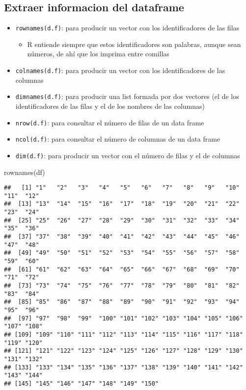 \documentclass[
]{article}
\newenvironment{Shaded}{\begin{snugshade}}{\end{snugshade}}
\newcommand{\FunctionTok}[1]{\textcolor[rgb]{0.00,0.00,0.00}{#1}}
\newcommand{\NormalTok}[1]{#1}
\providecommand{\tightlist}{%
  \setlength{\itemsep}{0pt}\setlength{\parskip}{0pt}}
\begin{document}
\hypertarget{extraer-informacion-del-dataframe}{%
\subsection{Extraer informacion del
dataframe}\label{extraer-informacion-del-dataframe}}

\begin{itemize}
\tightlist
\item
  \texttt{rownames(d.f)}: para producir un vector con los
  identificadores de las filas

  \begin{itemize}
  \tightlist
  \item
    R entiende siempre que estos identificadores son palabras, aunque
    sean números, de ahí que los imprima entre comillas
  \end{itemize}
\item
  \texttt{colnames(d.f)}: para producir un vector con los
  identificadores de las columnas
\item
  \texttt{dimnames(d.f)}: para producir una list formada por dos
  vectores (el de los identificadores de las filas y el de los nombres
  de las columnas)
\item
  \texttt{nrow(d.f)}: para consultar el número de filas de un data frame
\item
  \texttt{ncol(d.f)}: para consultar el número de columnas de un data
  frame
\item
  \texttt{dim(d.f)}: para producir un vector con el número de filas y el
  de columnas
\end{itemize}

\begin{Shaded}
\begin{Highlighting}[]
\FunctionTok{rownames}\NormalTok{(df)}
\end{Highlighting}
\end{Shaded}

\begin{verbatim}
##   [1] "1"   "2"   "3"   "4"   "5"   "6"   "7"   "8"   "9"   "10"  "11"  "12" 
##  [13] "13"  "14"  "15"  "16"  "17"  "18"  "19"  "20"  "21"  "22"  "23"  "24" 
##  [25] "25"  "26"  "27"  "28"  "29"  "30"  "31"  "32"  "33"  "34"  "35"  "36" 
##  [37] "37"  "38"  "39"  "40"  "41"  "42"  "43"  "44"  "45"  "46"  "47"  "48" 
##  [49] "49"  "50"  "51"  "52"  "53"  "54"  "55"  "56"  "57"  "58"  "59"  "60" 
##  [61] "61"  "62"  "63"  "64"  "65"  "66"  "67"  "68"  "69"  "70"  "71"  "72" 
##  [73] "73"  "74"  "75"  "76"  "77"  "78"  "79"  "80"  "81"  "82"  "83"  "84" 
##  [85] "85"  "86"  "87"  "88"  "89"  "90"  "91"  "92"  "93"  "94"  "95"  "96" 
##  [97] "97"  "98"  "99"  "100" "101" "102" "103" "104" "105" "106" "107" "108"
## [109] "109" "110" "111" "112" "113" "114" "115" "116" "117" "118" "119" "120"
## [121] "121" "122" "123" "124" "125" "126" "127" "128" "129" "130" "131" "132"
## [133] "133" "134" "135" "136" "137" "138" "139" "140" "141" "142" "143" "144"
## [145] "145" "146" "147" "148" "149" "150"
\end{verbatim}
\end{document}
